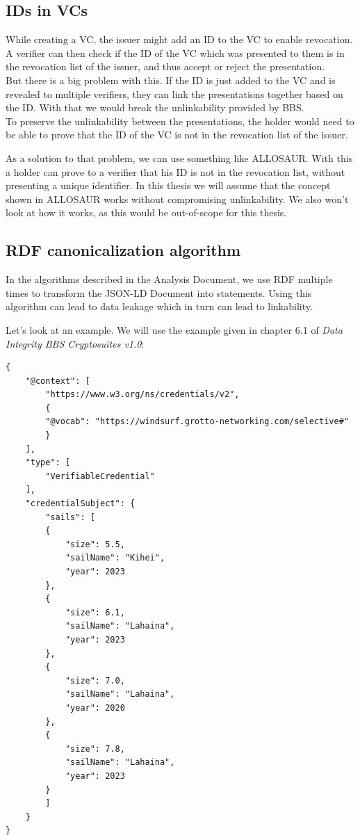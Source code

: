 \documentclass[
	a4paper               %
	,BCOR=0mm            %
	,bibliography=totoc   %
	,listof=totoc         %
	,monolingual
	,twoside=false
]{bfhthesis}              %
\begin{document}
\subsection{IDs in VCs}
While creating a VC, the issuer might add an ID to the VC to enable revocation.
A verifier can then check if the ID of the VC which was presented to them is in the revocation list of the issuer, and thus accept or reject the presentation.\\
But there is a big problem with this.
If the ID is just added to the VC and is revealed to multiple verifiers, they can link the presentations together based on the ID.
With that we would break the unlinkability provided by BBS.\\

To preserve the unlinkability between the presentations, the holder would need to be able to prove that the ID of the VC is not in the revocation list of the issuer.

As a solution to that problem, we can use something like ALLOSAUR\cite{allosaur}. 
With this a holder can prove to a verifier that his ID is not in the revocation list, without presenting a unique identifier.
In this thesis we will assume that the concept shown in ALLOSAUR works without compromising unlinkability.
We also won't look at how it works, as this would be out-of-scope for this thesis.

\subsection{RDF canonicalization algorithm}
In the algorithms described in the Analysis Document, we use RDF multiple times to transform the JSON-LD Document into statements.
Using this algorithm can lead to data leakage which in turn can lead to linkability.

Let's look at an example.
We will use the example given in chapter 6.1 of \textit{Data Integrity BBS Cryptosuites v1.0}\cite{bbsvc}:

\begin{lstlisting}[language=canon,firstnumber=1,caption={Example: Sails VC},captionpos=b]
{
	"@context": [
		"https://www.w3.org/ns/credentials/v2",
		{
		"@vocab": "https://windsurf.grotto-networking.com/selective#"
		}
	],
	"type": [
		"VerifiableCredential"
	],
	"credentialSubject": {
		"sails": [
		{
			"size": 5.5,
			"sailName": "Kihei",
			"year": 2023
		},
		{
			"size": 6.1,
			"sailName": "Lahaina",
			"year": 2023
		},
		{
			"size": 7.0,
			"sailName": "Lahaina",
			"year": 2020
		},
		{
			"size": 7.8,
			"sailName": "Lahaina",
			"year": 2023
		}
		]
	}
}
\end{lstlisting}
\end{document}
